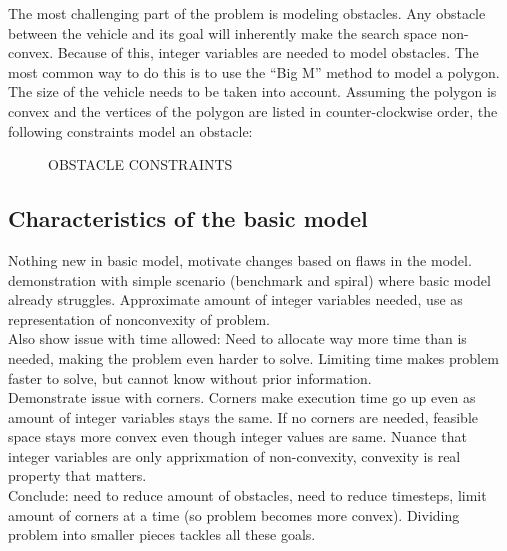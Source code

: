 The most challenging part of the problem is modeling obstacles. Any obstacle between the vehicle and its goal will inherently make the search space non-convex. Because of this, integer variables are needed to model obstacles. The most common way to do this is to use the ``Big M'' method to model a polygon. The size of the vehicle needs to be taken into account. Assuming the polygon is convex and the vertices of the polygon are listed in counter-clockwise order, the following constraints model an obstacle:

\begin{figure}[h]
OBSTACLE CONSTRAINTS \\
\end{figure}

\subsection{Characteristics of the basic model}
Nothing new in basic model, motivate changes based on flaws in the model. demonstration with simple scenario (benchmark and spiral) where basic model already struggles. Approximate amount of integer variables needed, use as representation of nonconvexity of problem. \\
Also show issue with time allowed: Need to allocate way more time than is needed, making the problem even harder to solve. Limiting time makes problem faster to solve, but cannot know without prior information.\\
Demonstrate issue with corners. Corners make execution time go up even as amount of integer variables stays the same. If no corners are needed, feasible space stays more convex even though integer values are same. Nuance that integer variables are only apprixmation of non-convexity, convexity is real property that matters.\\
Conclude: need to reduce amount of obstacles, need to reduce timesteps, limit amount of corners at a time (so problem becomes more convex). Dividing problem into smaller pieces tackles all these goals.
